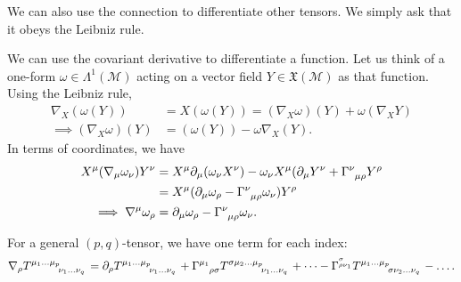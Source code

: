 We can also use the connection to differentiate other tensors. We simply ask that it obeys the Leibniz rule.
\begin{example}[]
  We can use the covariant derivative to differentiate a function. Let us think of a one-form $\omega \in \Lambda^1(\mathcal{M})$ acting on a vector field $Y \in \mathfrak{X}(\mathcal{M})$ as that function. Using the Leibniz rule,
  \begin{align}
    \nabla_X (\omega(Y)) &= X(\omega(Y)) = (\nabla_X \omega)(Y) + \omega (\nabla_X Y) \\
    \implies (\nabla_X \omega) (Y) &= (\omega(Y)) -\omega \nabla_X (Y).
  \end{align}
  In terms of coordinates, we have
  \begin{align}
    X^\mu(\nabla_\mu \omega_\nu) Y^\nu &= X^\mu \partial_\mu (\omega_\nu X^\nu) - \omega_\nu X^\mu (\partial_\mu Y^\nu + \Gamma \indices{^\nu_\mu_\rho} Y^\rho \\
				       &= X^\mu (\partial_\mu \omega_\rho - \Gamma \indices{^\nu_\mu_\rho} \omega_\nu) Y^\rho \\
				       \implies \nabla^\mu \omega_\rho &= \partial_\mu \omega_\rho - \Gamma \indices{^\nu_\mu_\rho} \omega_\nu.
  \end{align}
\end{example}
For a general $(p, q)$-tensor, we have one term for each index:
\begin{equation}
  \nabla_\rho T \indices{^{\mu_1 \dots \mu_p}_{\nu_1 \dots \nu_q}} = \partial_\rho T \indices{^{\mu_1 \dots \mu_p}_{\nu_1 \dots \nu_q}} + \Gamma \indices{^{\mu_1}_\rho_\sigma} T \indices{^{\sigma \mu_2 \dots \mu_p}_{\nu_1 \dots \nu_q}} + \dots - \Gamma^{^\sigma_{\rho \nu_1}} T \indices{^{\mu_1 \dots \mu_p}_{\sigma \nu_2 \dots \nu_q}} - \dots.
\end{equation}

